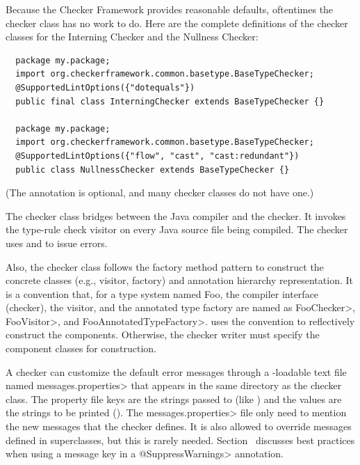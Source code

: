 Because the Checker Framework provides reasonable defaults, oftentimes the
checker class has no work to do.  Here are the complete definitions of the
checker classes for the Interning Checker and the Nullness Checker:

\begin{Verbatim}
  package my.package;
  import org.checkerframework.common.basetype.BaseTypeChecker;
  @SupportedLintOptions({"dotequals"})
  public final class InterningChecker extends BaseTypeChecker {}

  package my.package;
  import org.checkerframework.common.basetype.BaseTypeChecker;
  @SupportedLintOptions({"flow", "cast", "cast:redundant"})
  public class NullnessChecker extends BaseTypeChecker {}
\end{Verbatim}

(The  annotation is
optional, and many checker classes do not have one.)

The checker class bridges between the Java compiler and the checker.  It
invokes the type-rule check visitor on every Java source file being
compiled.  The checker uses
and
to issue errors.

Also, the checker class follows the factory method pattern to
construct the concrete classes (e.g., visitor, factory) and annotation
hierarchy representation.  It is a convention that, for
a type system named Foo, the compiler
interface (checker), the visitor, and the annotated type factory are
named as \<FooChecker>, \<FooVisitor>, and \<FooAnnotatedTypeFactory>.
 uses the convention to
reflectively construct the components.  Otherwise, the checker writer
must specify the component classes for construction.

\begin{sloppypar}
A checker can customize the default error messages through a
-loadable text file named
\<messages.properties> that appears in the same directory as the checker class.
The property file keys are the strings passed to 
(like ) and the values are the strings to be
printed ().
The \<messages.properties> file only need to mention the new messages that
the checker defines.
It is also allowed to override messages defined in superclasses, but this
is rarely needed.
Section~ discusses best practices
when using a message key in a \<@SuppressWarnings> annotation.
\end{sloppypar}

